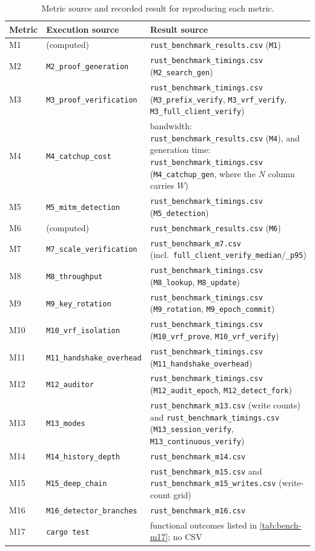 \begin{table}[ht]
\centering
\caption{Metric source and recorded result for reproducing each metric.}
\label{tab:bench-repro}
\setlength{\extrarowheight}{2pt}
\footnotesize
\begin{tabular}{@{}l l >{\raggedright\arraybackslash}p{8.8cm}@{}}
\toprule
Metric & Execution source & Result source \\
\midrule
M1  & (computed)                & \texttt{rust\_benchmark\_results.csv} (\texttt{M1}) \\
M2  & \texttt{M2\_proof\_generation}   & \texttt{rust\_benchmark\_timings.csv} (\texttt{M2\_search\_gen}) \\
M3  & \texttt{M3\_proof\_verification} & \texttt{rust\_benchmark\_timings.csv} (\texttt{M3\_prefix\_verify}, \texttt{M3\_vrf\_verify}, \texttt{M3\_full\_client\_verify}) \\
M4  & \texttt{M4\_catchup\_cost}       & bandwidth: \texttt{rust\_benchmark\_results.csv} (\texttt{M4}), and generation time: \texttt{rust\_benchmark\_timings.csv} (\texttt{M4\_catchup\_gen}, where the $N$ column carries $W$) \\
M5  & \texttt{M5\_mitm\_detection}     & \texttt{rust\_benchmark\_timings.csv} (\texttt{M5\_detection}) \\
M6  & (computed)                & \texttt{rust\_benchmark\_results.csv} (\texttt{M6}) \\
M7  & \texttt{M7\_scale\_verification} & \texttt{rust\_benchmark\_m7.csv} (incl.\ \texttt{full\_client\_verify\_median}/\texttt{\_p95}) \\
M8  & \texttt{M8\_throughput}          & \texttt{rust\_benchmark\_timings.csv} (\texttt{M8\_lookup}, \texttt{M8\_update}) \\
M9  & \texttt{M9\_key\_rotation}       & \texttt{rust\_benchmark\_timings.csv} (\texttt{M9\_rotation}, \texttt{M9\_epoch\_commit}) \\
M10 & \texttt{M10\_vrf\_isolation}     & \texttt{rust\_benchmark\_timings.csv} (\texttt{M10\_vrf\_prove}, \texttt{M10\_vrf\_verify}) \\
M11 & \texttt{M11\_handshake\_overhead}& \texttt{rust\_benchmark\_timings.csv} (\texttt{M11\_handshake\_overhead}) \\
M12 & \texttt{M12\_auditor}            & \texttt{rust\_benchmark\_timings.csv} (\texttt{M12\_audit\_epoch}, \texttt{M12\_detect\_fork}) \\
M13 & \texttt{M13\_modes}              & \texttt{rust\_benchmark\_m13.csv} (write counts) and \texttt{rust\_benchmark\_timings.csv} (\texttt{M13\_session\_verify}, \texttt{M13\_continuous\_verify}) \\
M14 & \texttt{M14\_history\_depth}      & \texttt{rust\_benchmark\_m14.csv} \\
M15 & \texttt{M15\_deep\_chain}         & \texttt{rust\_benchmark\_m15.csv} and \texttt{rust\_benchmark\_m15\_writes.csv} (write-count grid) \\
M16 & \texttt{M16\_detector\_branches}  & \texttt{rust\_benchmark\_m16.csv} \\
M17 & \texttt{cargo test} &
functional outcomes listed in \cref{tab:bench-m17}; no CSV \\
\bottomrule
\end{tabular}
\end{table}
